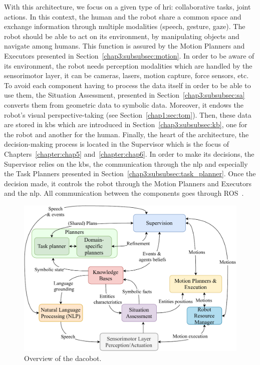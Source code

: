 \documentclass[a4paper,11pt,twoside]{StyleThese}
\begin{document}
With this architecture, we focus on a given type of \acrlong{hri}: collaborative tasks, joint actions. In this context, the human and the robot share a common space and exchange information through multiple modalities (speech, gesture, gaze). The robot should be able to act on its environment, by manipulating objects and navigate among humans. This function is assured by the Motion Planners and Executors presented in Section~\ref{chap3:subsubsec:motion}. In order to be aware of its environment, the robot needs perception modalities which are handled by the sensorimotor layer, it can be cameras, lasers, motion capture, force sensors, etc. To avoid each component having to process the data itself in order to be able to use them, the Situation Assessment, presented in Section~\ref{chap3:subsubsec:sa} converts them from geometric data to symbolic data. Moreover, it endows the robot's visual perspective-taking (see Section~\ref{chap1:sec:tom}). Then, these data are stored in \acrlong{kb}s which are introduced in Section~\ref{chap3:subsubsec:kb}, one for the robot and another for the human. Finally, the heart of the architecture, the decision-making process is located in the Supervisor which is the focus of Chapters~\ref{chapter:chap5} and~\ref{chapter:chap6}. In order to make its decisions, the Supervisor relies on the \acrshort{kb}s, the communication through the \acrfull{nlp} and especially the Task Planners presented in Section~\ref{chap3:subsubsec:task_planner}. Once the decision made, it controls the robot through the Motion Planners and Executors and the \acrshort{nlp}. All communication between the components goes through ROS~\citep{quigley_2009_ros}.

\begin{figure}[!ht]
	\includegraphics[width=\linewidth]{figures/chapter2/archi_overview.pdf}
	\caption{Overview of the \acrfull{dacobot}.}
	\label{chap3:fig:archi}
\end{figure}
\end{document}
